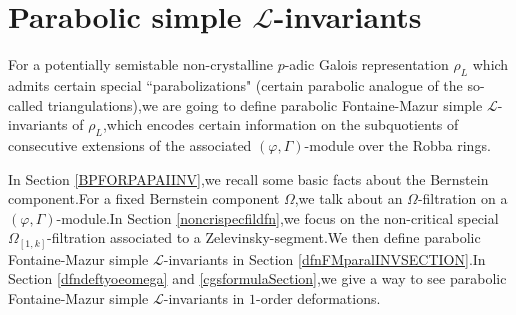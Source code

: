 \documentclass[SecEq,CM,GP]{degruyter-crelle} %
\theoremstyle{plain}
\newcommand{\homo}{{\rm Hom}}
\newcommand{\omepik}{\Omega_{[1,k]}}
\newcommand{\bQ}{{\mathbf{Q}}}
\newcommand{\sL}{\mathcal L}
\begin{document}
%
%







\section{Parabolic simple \texorpdfstring{$\sL$}{Lg}-invariants}\label{sectionparasimlinv}

For a potentially semistable non-crystalline $p$-adic Galois representation $\rho_L$ which admits certain special ``parabolizations" (certain parabolic analogue of the so-called triangulations),\;we are going to define parabolic Fontaine-Mazur simple $\sL$-invariants of $\rho_L$,\;which encodes certain information on the subquotients of consecutive extensions  of the associated $(\varphi,\Gamma)$-module over the Robba rings.\;

In Section \ref{BPFORPAPAIINV},\;we recall some basic facts about the Bernstein component.\;For a fixed 
Bernstein component $\Omega$,\;we talk about an $\Omega$-filtration on a $(\varphi,\Gamma)$-module.\;In Section \ref{noncrispecfildfn},\;we focus on the non-critical special $\omepik$-filtration associated to a Zelevinsky-segment.\;We then define parabolic Fontaine-Mazur simple $\sL$-invariants in Section \ref{dfnFMparalINVSECTION}.\;In Section \ref{dfndeftyoeomega} and \ref{cgsformulaSection},\;we give a way to see parabolic Fontaine-Mazur simple $\sL$-invariants in $1$-order deformations.\;
\end{document}
